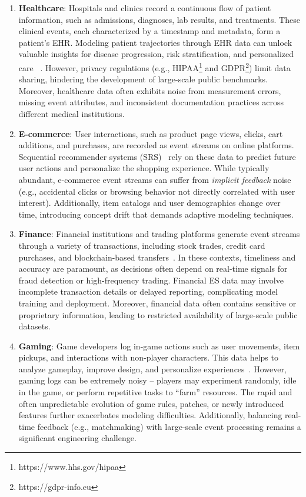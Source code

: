 \documentclass[twoside,11pt]{article}
\begin{document}
\begin{enumerate}
\item \textbf{Healthcare}: Hospitals and clinics record a continuous flow of patient information, such as admissions, diagnoses, lab results, and treatments. These clinical events, each characterized by a timestamp and metadata, form a patient’s EHR. Modeling patient trajectories through EHR data can unlock valuable insights for disease progression, risk stratification, and personalized care ~. However, privacy regulations (e.g., HIPAA\footnote{https://www.hhs.gov/hipaa} and GDPR\footnote{https://gdpr-info.eu}) limit data sharing, hindering the development of large-scale public benchmarks. Moreover, healthcare data often exhibits noise from measurement errors, missing event attributes, and inconsistent documentation practices across different medical institutions.

\item \textbf{E-commerce}: User interactions, such as product page views, clicks, cart additions, and purchases, are recorded as event streams on online platforms. Sequential recommender systems (SRS)~ rely on these data to predict future user actions and personalize the shopping experience. While typically abundant, e-commerce event streams can suffer from {\it implicit feedback} noise (e.g., accidental clicks or browsing behavior not directly correlated with user interest). Additionally, item catalogs and user demographics change over time, introducing concept drift that demands adaptive modeling techniques.

\item \textbf{Finance}: Financial institutions and trading platforms generate event streams through a variety of transactions, including stock trades, credit card purchases, and blockchain-based transfers~. In these contexts, timeliness and accuracy are paramount, as decisions often depend on real-time signals for fraud detection or high-frequency trading. Financial ES data may involve incomplete transaction details or delayed reporting, complicating model training and deployment. Moreover, financial data often contains sensitive or proprietary information, leading to restricted availability of large-scale public datasets.

\item \textbf{Gaming}: Game developers log in-game actions such as user movements, item pickups, and interactions with non-player characters. This data helps to analyze gameplay, improve design, and personalize experiences~. However, gaming logs can be extremely noisy -- players may experiment randomly, idle in the game, or perform repetitive tasks to ``farm'' resources. The rapid and often unpredictable evolution of game rules, patches, or newly introduced features further exacerbates modeling difficulties. Additionally, balancing real-time feedback (e.g., matchmaking) with large-scale event processing remains a significant engineering challenge.
\end{enumerate}
\end{document}
